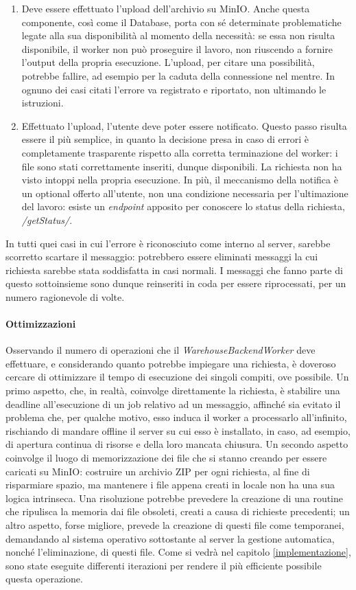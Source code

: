 \begin{enumerate}
    \item Deve essere effettuato l'upload dell'archivio su MinIO. Anche questa componente, così come il Database, porta con sé determinate problematiche legate alla sua disponibilità al momento della necessità: se essa non risulta disponibile, il worker non può proseguire il lavoro, non riuscendo a fornire l'output della propria esecuzione. L'upload, per citare una possibilità, potrebbe fallire, ad esempio per la caduta della connessione nel mentre. In ognuno dei casi citati l'errore va registrato e riportato, non ultimando le istruzioni.
    \item Effettuato l'upload, l'utente deve poter essere notificato. Questo passo risulta essere il più semplice, in quanto la decisione presa in caso di errori è completamente trasparente rispetto alla corretta terminazione del worker: i file sono stati correttamente inseriti, dunque disponibili. La richiesta non ha visto intoppi nella propria esecuzione. In più, il meccanismo della notifica è un optional offerto all'utente, non una condizione necessaria per l'ultimazione del lavoro: esiste un \textit{endpoint} apposito per conoscere lo status della richiesta, \textit{/getStatus/}. 
\end{enumerate}
In tutti quei casi in cui l'errore è riconosciuto come interno al server, sarebbe scorretto scartare il messaggio: potrebbero essere eliminati messaggi la cui richiesta sarebbe stata soddisfatta in casi normali. I messaggi che fanno parte di questo sottoinsieme sono dunque reinseriti in coda per essere riprocessati, per un numero ragionevole di volte.

\paragraph{Ottimizzazioni} Osservando il numero di operazioni che il \textit{WarehouseBackendWorker} deve effettuare, e considerando quanto potrebbe impiegare una richiesta, è doveroso cercare di ottimizzare il tempo di esecuzione dei singoli compiti, ove possibile. Un primo aspetto, che, in realtà, coinvolge direttamente la richiesta, è stabilire una deadline all'esecuzione di un job relativo ad un messaggio, affinché sia evitato il problema che, per qualche motivo, esso induca il worker a processarlo all'infinito, rischiando di mandare offline il server su cui esso è installato, in caso, ad esempio, di apertura continua di risorse e della loro mancata chiusura. Un secondo aspetto coinvolge il luogo di memorizzazione dei file che si stanno creando per essere caricati su MinIO: costruire un archivio ZIP per ogni richiesta, al fine di risparmiare spazio, ma mantenere i file appena creati in locale non ha una sua logica intrinseca. Una risoluzione potrebbe prevedere la creazione di una routine che ripulisca la memoria dai file obsoleti, creati a causa di richieste precedenti; un altro aspetto, forse migliore, prevede la creazione di questi file come temporanei, demandando al sistema operativo sottostante al server la gestione automatica, nonché l'eliminazione, di questi file. Come si vedrà nel capitolo \ref{implementazione}, sono state eseguite differenti iterazioni per rendere il più efficiente possibile questa operazione.

